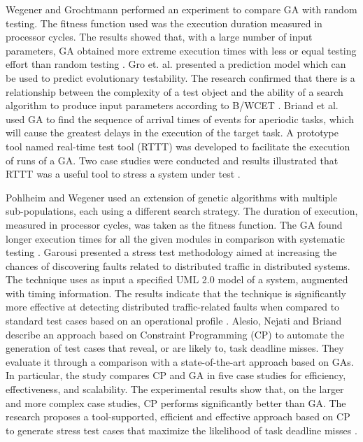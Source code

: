 \documentclass[espaco=umemeio,chapter=TITLE,twoside,openright]{abnt}
\begin{document}
Wegener and Grochtmann performed an experiment to compare GA with random testing. The fitness function used was the execution duration measured in processor cycles.  The results showed that, with a large number of input parameters, GA obtained more extreme execution times with less or equal testing effort than random testing \cite{J.WegenerK.GrimmM.GrochtmannH.Sthamer1996} \cite{Wegener1998}. Gro et. al. \cite{Gross2000} presented a prediction model which can be used to predict evolutionary testability. The research confirmed that there is a relationship between the complexity of a test object and the ability of a search algorithm to produce input parameters according to B/WCET \cite{Gross2000}. Briand et al. \cite{Briand2005} used GA to find the sequence of arrival times of events for aperiodic tasks, which will cause the greatest delays in the execution of the target task. A prototype tool named real-time test tool (RTTT) was developed to facilitate the execution of runs of a GA. Two case studies were conducted and results illustrated that RTTT was a useful tool to stress a system under test \cite{Briand2005}.


Pohlheim and Wegener used an extension of genetic algorithms with multiple sub-populations, each using a different search strategy. The duration of execution, measured in processor cycles, was taken as the fitness
function. The GA found longer execution times for all the given modules in comparison with systematic testing \cite{Pohlheim2005}. Garousi presented a stress test methodology aimed at increasing the chances of discovering faults related to distributed traffic in distributed systems. The technique uses as input a specified UML 2.0 model of a system, augmented with timing information. The results indicate that the technique is significantly more effective at detecting distributed traffic-related faults when compared to standard test cases based on an operational profile \cite{Garousi2006}. Alesio, Nejati and Briand describe an approach based
on Constraint Programming (CP) to automate the generation of test cases that reveal, or are likely to, task deadline misses. They evaluate it through a comparison with a state-of-the-art approach based on GAs. In particular, the study compares CP and GA in five case studies for efficiency, effectiveness, and scalability. The experimental results show that, on the larger and more complex case studies, CP performs significantly better than GA. The research proposes a tool-supported, efficient and effective approach based on CP to generate stress test cases that maximize the likelihood of task deadline misses \cite{DiAlesio2013}.
\end{document}
